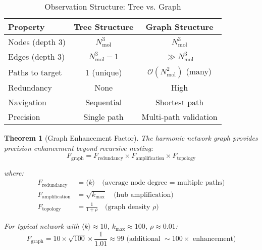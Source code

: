 \documentclass[12pt,a4paper]{article}
\newtheorem{theorem}{Theorem}[section]
\begin{document}
\begin{table}[H]
\centering
\caption{Observation Structure: Tree vs. Graph}
\begin{tabular}{lcc}
\toprule
Property & Tree Structure & Graph Structure \\
\midrule
Nodes (depth 3) & $N_{\text{mol}}^3$ & $N_{\text{mol}}^3$ \\
Edges (depth 3) & $N_{\text{mol}}^3 - 1$ & $\gg N_{\text{mol}}^3$ \\
Paths to target & 1 (unique) & $\mathcal{O}(N_{\text{mol}}^2)$ (many) \\
Redundancy & None & High \\
Navigation & Sequential & Shortest path \\
Precision & Single path & Multi-path validation \\
\bottomrule
\end{tabular}
\end{table}

\begin{theorem}[Graph Enhancement Factor]
The harmonic network graph provides precision enhancement beyond recursive nesting:
\begin{equation}
F_{\text{graph}} = F_{\text{redundancy}} \times F_{\text{amplification}} \times F_{\text{topology}}
\end{equation}

where:
\begin{align}
F_{\text{redundancy}} &= \langle k \rangle \quad \text{(average node degree = multiple paths)} \\
F_{\text{amplification}} &= \sqrt{k_{\max}} \quad \text{(hub amplification)} \\
F_{\text{topology}} &= \frac{1}{1 + \rho} \quad \text{(graph density } \rho \text{)}
\end{align}

For typical network with $\langle k \rangle \approx 10$, $k_{\max} \approx 100$, $\rho \approx 0.01$:
\begin{equation}
F_{\text{graph}} = 10 \times \sqrt{100} \times \frac{1}{1.01} \approx 99 \text{ (additional } \sim100\times \text{ enhancement)}
\end{equation}
\end{theorem}
\end{document}
